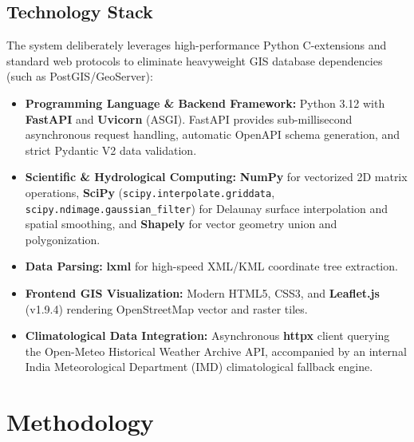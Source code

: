 \documentclass[manuscript,screen]{acmart}
\begin{document}
\subsection{Technology Stack}
The system deliberately leverages high-performance Python C-extensions and standard web protocols to eliminate heavyweight GIS database dependencies (such as PostGIS/GeoServer):
\begin{itemize}
    \item \textbf{Programming Language \& Backend Framework:} Python 3.12 with \textbf{FastAPI} and \textbf{Uvicorn} (ASGI). FastAPI provides sub-millisecond asynchronous request handling, automatic OpenAPI schema generation, and strict Pydantic V2 data validation.
    \item \textbf{Scientific \& Hydrological Computing:} \textbf{NumPy} for vectorized 2D matrix operations, \textbf{SciPy} (\texttt{scipy.interpolate.griddata}, \texttt{scipy.ndimage.gaussian\_filter}) for Delaunay surface interpolation and spatial smoothing, and \textbf{Shapely} for vector geometry union and polygonization.
    \item \textbf{Data Parsing:} \textbf{lxml} for high-speed XML/KML coordinate tree extraction.
    \item \textbf{Frontend GIS Visualization:} Modern HTML5, CSS3, and \textbf{Leaflet.js} (v1.9.4) rendering OpenStreetMap vector and raster tiles.
    \item \textbf{Climatological Data Integration:} Asynchronous \textbf{httpx} client querying the Open-Meteo Historical Weather Archive API, accompanied by an internal India Meteorological Department (IMD) climatological fallback engine.
\end{itemize}

\section{Methodology}
\label{sec:methodology}
\end{document}
